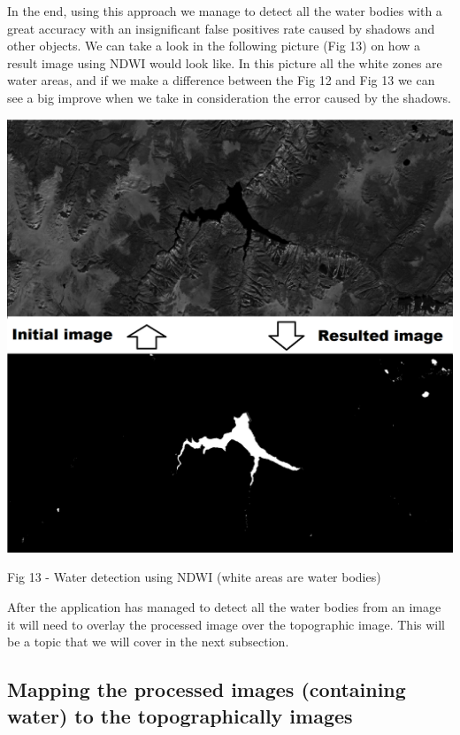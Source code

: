 \documentclass[12pt, a4paper]{report}
\begin{document}
In the end, using this approach we manage to detect all the water bodies with a great accuracy with an insignificant false positives rate caused by shadows and other objects. We can take a look in the following picture (Fig 13) on how a result image using NDWI would look like. In this picture all the white zones are water areas, and if we make a difference between the Fig 12 and Fig 13 we can see a big improve when we take in consideration the error caused by the shadows.
\par 


\bigskip
\includegraphics[scale=0.4, left]{NDWI-prediction.png}
\begin{center}
Fig 13 - Water detection using NDWI (white areas are water bodies)
\end{center}
\par 

After the application has managed to detect all the water bodies from an image it will need to overlay the processed image over the topographic image. This will be a topic that we will cover in the next subsection.

\subsection{Mapping the processed images (containing water) to the topographically images}
\end{document}
